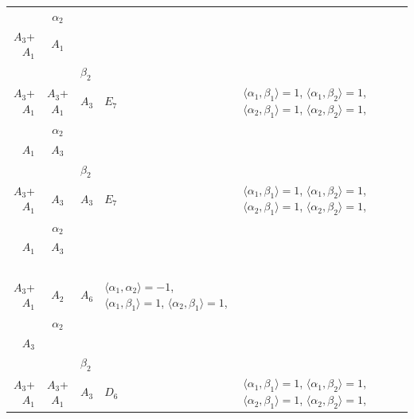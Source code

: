 \documentclass[12pt]{report}
\begin{document}
\begin{appendix}
{\begin{longtable}{rcl p{1cm}p{1cm}p{3cm} }
\\
\begin{tabular}{cc}$\alpha_1$+ & $\alpha_2$\\\tiny{ $A_3$+$A_1$ } & \tiny{ $A_1$ }\end{tabular} &\begin{tabular}{c} = \\~ \end{tabular} & \begin{tabular}{cc}$\beta_1$+ & $\beta_2$\\\tiny{ $A_3$+$A_1$ } & \tiny{ $A_3$+$A_1$ }\end{tabular} & $A_3$ & $E_7$ &  $\langle\alpha_1, \beta_1\rangle=1$, $\langle\alpha_1, \beta_2\rangle=1$, $\langle\alpha_2, \beta_1\rangle=1$, $\langle\alpha_2, \beta_2\rangle=1$, 
\\
\begin{tabular}{cc}$\alpha_1$+ & $\alpha_2$\\\tiny{ $A_1$ } & \tiny{ $A_3$ }\end{tabular} &\begin{tabular}{c} = \\~ \end{tabular} & \begin{tabular}{cc}$\beta_1$+ & $\beta_2$\\\tiny{ $A_3$+$A_1$ } & \tiny{ $A_3$ }\end{tabular} & $A_3$ & $E_7$ &  $\langle\alpha_1, \beta_1\rangle=1$, $\langle\alpha_1, \beta_2\rangle=1$, $\langle\alpha_2, \beta_1\rangle=1$, $\langle\alpha_2, \beta_2\rangle=1$, 
\\
\begin{tabular}{cc}$\alpha_1$+ & $\alpha_2$\\\tiny{ $A_1$ } & \tiny{ $A_3$ }\end{tabular} &\begin{tabular}{c} = \\~ \end{tabular} & \begin{tabular}{c}$\beta_1$\\\tiny{ $A_3$+$A_1$ }\end{tabular} & $A_2$ & $A_6$ & $\langle\alpha_1, \alpha_2\rangle=-1$,  $\langle\alpha_1, \beta_1\rangle=1$, $\langle\alpha_2, \beta_1\rangle=1$, 
\\
\begin{tabular}{cc}$\alpha_1$+ & $\alpha_2$\\\tiny{ $A_3$ } & \tiny{  }\end{tabular} &\begin{tabular}{c} = \\~ \end{tabular} & \begin{tabular}{cc}$\beta_1$+ & $\beta_2$\\\tiny{ $A_3$+$A_1$ } & \tiny{ $A_3$+$A_1$ }\end{tabular} & $A_3$ & $D_6$ &  $\langle\alpha_1, \beta_1\rangle=1$, $\langle\alpha_1, \beta_2\rangle=1$, $\langle\alpha_2, \beta_1\rangle=1$, $\langle\alpha_2, \beta_2\rangle=1$, 

\end{longtable}}
\end{appendix}
\end{document}
